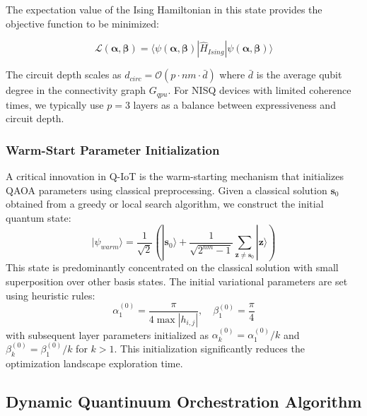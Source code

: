 \documentclass[lettersize,journal]{IEEEtran}
\begin{document}
The expectation value of the Ising Hamiltonian in this state provides the objective function to be minimized:

\begin{equation}
\mathcal{L}(\boldsymbol{\alpha}, \boldsymbol{\beta}) = \langle \psi(\boldsymbol{\alpha}, \boldsymbol{\beta}) | \hat{H}_{Ising} | \psi(\boldsymbol{\alpha}, \boldsymbol{\beta}) \rangle
\label{eq:loss_function}
\end{equation}

The circuit depth scales as $d_{circ} = \mathcal{O}(p \cdot nm \cdot \bar{d})$ where $\bar{d}$ is the average qubit degree in the connectivity graph $G_{qpu}$. For NISQ devices with limited coherence times, we typically use $p = 3$ layers as a balance between expressiveness and circuit depth.

\subsubsection{Warm-Start Parameter Initialization}

A critical innovation in Q-IoT is the warm-starting mechanism that initializes QAOA parameters using classical preprocessing. Given a classical solution $\mathbf{s}_0$ obtained from a greedy or local search algorithm, we construct the initial quantum state:
\begin{equation}
|\psi_{warm}\rangle = \frac{1}{\sqrt{2}} \left( |\mathbf{s}_0\rangle + \frac{1}{\sqrt{2^{nm}-1}} \sum_{\mathbf{z} \neq \mathbf{s}_0} |\mathbf{z}\rangle \right)
\label{eq:warm_state}
\end{equation}
This state is predominantly concentrated on the classical solution with small superposition over other basis states. The initial variational parameters are set using heuristic rules:
\begin{equation}
\alpha_1^{(0)} = \frac{\pi}{4\max|h_{i,j}|}, \quad \beta_1^{(0)} = \frac{\pi}{4}
\label{eq:warm_params}
\end{equation}
with subsequent layer parameters initialized as $\alpha_k^{(0)} = \alpha_1^{(0)}/k$ and $\beta_k^{(0)} = \beta_1^{(0)}/k$ for $k > 1$. This initialization significantly reduces the optimization landscape exploration time.

\subsection{Dynamic Quantinuum Orchestration Algorithm}
\label{subsec:orchestration}
\end{document}
